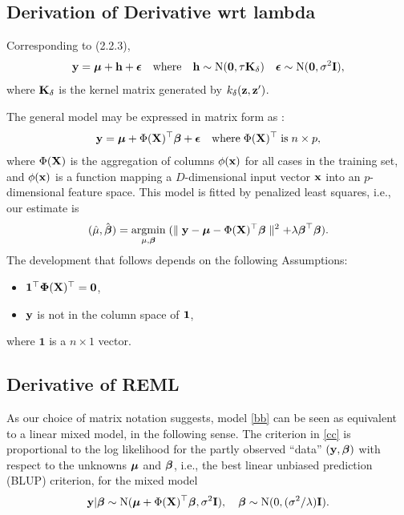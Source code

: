 \documentclass[article]{jss}
\begin{document}
\begin{appendix}
\setcounter{equation}{0}
\renewcommand{\theequation}{App.\arabic{equation}}
\section{Derivation of Derivative wrt lambda} \label{app:technical}

Corresponding to (2.2.3),
\begin{align*}
{\bf y}=\boldsymbol{\mu}+{\bf h}+\boldsymbol{\epsilon} \quad \mbox{where} \quad {\bf h} \sim \mathrm{N}(\mathbf{0}, \tau {\bf K}_\delta) \quad \boldsymbol{\epsilon} \sim \mathrm{N}(\mathbf{0}, \sigma^2{\bf I}),
\end{align*}
where ${\bf K}_\delta$ is the kernel matrix generated by $k_{\delta}({\bf z}, {\bf z}')$.

The general model may be expressed in matrix form as \citep{reiss_smoothing_2009}:
\begin{align}
{\bf y}=\boldsymbol{\mu}+\Phi({\bf X})^\top  \boldsymbol{\beta}+\boldsymbol{\epsilon} \quad \mbox{where}\; \Phi({\bf X})^\top \;\mbox{is}\; n\times p, \label{bb}
\end{align}
where $\Phi({\bf X})$ is the aggregation of columns $\phi({\bf x})$ for all cases in the training set, and $\phi({\bf x})$ is a function mapping a $D$-dimensional input vector ${\bf x}$ into an $p$-dimensional feature space. This model is fitted by penalized least squares, i.e., our estimate is
\begin{align}
(\hat{\mu}, \hat{\boldsymbol{\beta}})=\underset{\mu, \boldsymbol{\beta}}{\mbox{argmin}} \; (\parallel {\bf y}-\boldsymbol{\mu}-\Phi({\bf X})^\top \boldsymbol{\beta} \parallel^2+\lambda \boldsymbol{\beta}^\top \boldsymbol{\beta}). \label{cc}
\end{align}
The development that follows depends on the following Assumptions:
\begin{itemize}
\item $\bf{1}^\top \Phi({\bf X})^\top=\mathbf{0}$,
\item ${\bf y}$ is not in the column space of $\bf{1}$,
\end{itemize}
where $\mathbf{1}$ is a $n\times 1$ vector.

\subsection{Derivative of REML}

As our choice of matrix notation suggests, model \eqref{bb} can be seen as equivalent to a linear mixed model, in the following sense. The criterion in \eqref{cc} is proportional to the log likelihood for the partly observed ``data'' $({\bf y}, \boldsymbol{\beta})$ with respect to the unknowns $\boldsymbol{\mu}$ and $\boldsymbol{\beta}$, i.e., the best linear unbiased prediction (BLUP) criterion, for the mixed model
\begin{align*}
{\bf y}|\boldsymbol{\beta} \sim \mathrm{N}(\boldsymbol{\mu}+\Phi({\bf X})^\top \boldsymbol{\beta}, \sigma^2{\bf I}), \quad \boldsymbol{\beta} \sim \mathrm{N}(0, (\sigma^2/\lambda) {\bf I}).
\end{align*}


\end{appendix}
\end{document}
